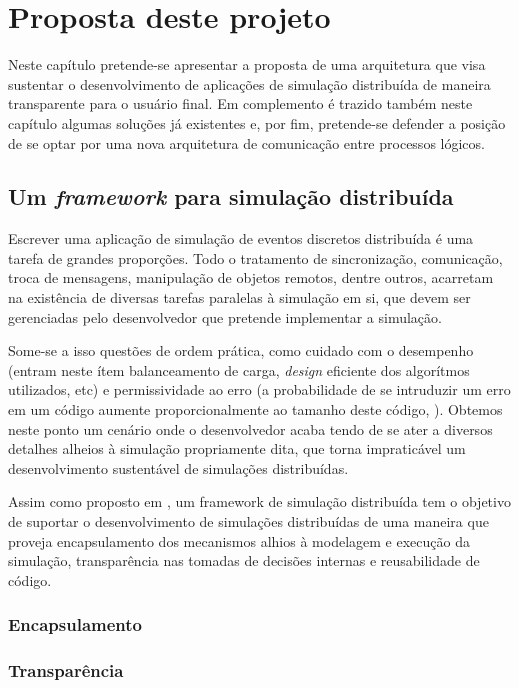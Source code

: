 \chapter{Proposta deste projeto}

Neste capítulo pretende-se apresentar a proposta de uma arquitetura que visa sustentar o desenvolvimento de aplicações de simulação distribuída de maneira transparente para o usuário final. Em complemento é trazido também neste capítulo algumas soluções já existentes e, por fim, pretende-se defender a posição de se optar por uma nova arquitetura de comunicação entre processos lógicos.

\section{Um \textit{framework} para simulação distribuída}

Escrever uma aplicação de simulação de eventos discretos distribuída é uma tarefa de grandes proporções. Todo o tratamento de sincronização, comunicação, troca de mensagens, manipulação de objetos remotos, dentre outros, acarretam na existência de diversas tarefas paralelas à simulação em si, que devem ser gerenciadas pelo desenvolvedor que pretende implementar a simulação.

Some-se a isso questões de ordem prática, como cuidado com o desempenho (entram neste ítem balanceamento de carga, \textit{design} eficiente dos algorítmos utilizados, etc) e permissividade ao erro (a probabilidade de se intruduzir um erro em um código aumente proporcionalmente ao tamanho deste código, \cite{HONGYU09}). Obtemos neste ponto um cenário onde o desenvolvedor acaba tendo de se ater a diversos detalhes alheios à simulação propriamente dita, que torna impraticável um desenvolvimento sustentável de simulações distribuídas.

Assim como proposto em \cite{LIVERSON}, um framework de simulação distribuída tem o objetivo de suportar o desenvolvimento de simulações distribuídas de uma maneira que proveja encapsulamento dos mecanismos alhios à modelagem e execução da simulação, transparência nas tomadas de decisões internas e reusabilidade de código.

\subsection{Encapsulamento}

\subsection{Transparência}


